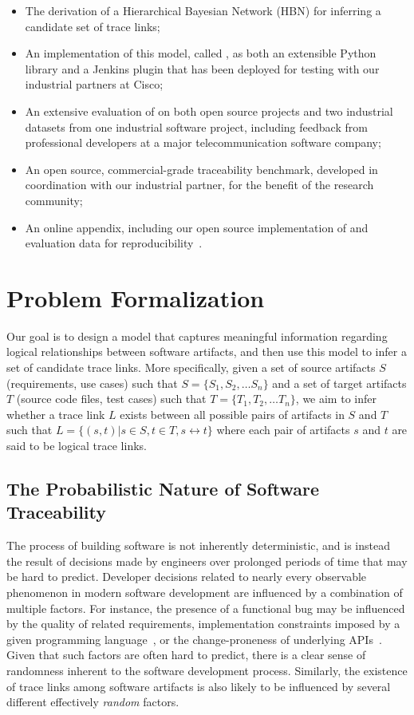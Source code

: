 \begin{itemize}
	\item{The derivation of a Hierarchical Bayesian Network (HBN) for inferring a candidate set of trace links;}	
	\item{An implementation of this model, called \Comet, as both an extensible Python library and a Jenkins plugin that has been deployed for testing with our industrial partners at Cisco;}
	\item{An extensive evaluation of \Comet on both open source projects and two industrial datasets from one industrial software project, including feedback from professional developers at a major telecommunication software company;}
	\item{An open source, commercial-grade traceability benchmark, developed in coordination with our industrial partner, for the benefit of the research community;}
	\item{An online appendix, including our open source implementation of \Comet and evaluation data for reproducibility~\cite{appendix}}.
\end{itemize}

\section{Problem Formalization}

Our goal is to design a model that captures meaningful information regarding logical relationships between software artifacts, and then use this model to infer a set of candidate trace links. More specifically, given a set of source artifacts $S$ (\eg requirements, use cases) such that $S = \{S_{1},S_{2},\ldots S_{n}\}$ and a set of target artifacts $T$ (\eg source code files, test cases) such that $T = \{T_{1},T_{2},\ldots T_{n}\}$, we aim to infer whether a trace link $L$ exists between all possible pairs of artifacts in $S$ and $T$ such that $L = \{(s,t) | s\in S, t\in T, s\leftrightarrow t\}$ where each pair of artifacts $s$ and $t$ are said to be logical trace links.


\subsection{The Probabilistic Nature of Software Traceability}
The process of building software is not inherently deterministic, and is instead the result of decisions made by engineers over prolonged periods of time that may be hard to predict. Developer decisions related to nearly every observable phenomenon in modern software development are influenced by a combination of multiple factors. For instance, the presence of a functional bug may be influenced by the quality of related requirements, implementation constraints imposed by a given programming language~\citep{Ray:CACM'17}, or the change-proneness of underlying APIs~\citep{Linares-Vasquez:FSE'13}. Given that such factors are often hard to predict, there is a clear sense of randomness inherent to the software development process. Similarly, the existence of trace links among software artifacts is also likely to be influenced by several different effectively \textit{random} factors.  

